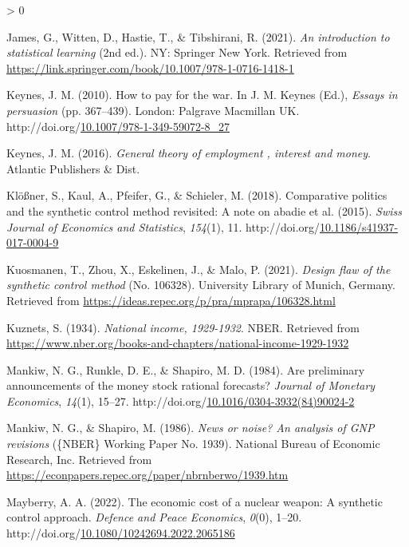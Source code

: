 \documentclass[12pt,nobind, a4paper]{reedthesis}
\newlength{\cslhangindent}
\newenvironment{CSLReferences}[2] %
{%
	\setlength{\parindent}{0pt}
	\ifodd #1 \everypar{\setlength{\hangindent}{\cslhangindent}}\ignorespaces\fi
	\ifnum #2 > 0
	\setlength{\parskip}{#2\baselineskip}
	\fi
}%
{}
\begin{document}
\begin{CSLReferences}{1}{0}
 \leavevmode\hypertarget{ref-james_introduction_2021}{}%
 James, G., Witten, D., Hastie, T., \& Tibshirani, R. (2021). \emph{An introduction to statistical learning} (2nd ed.). {NY}: Springer New York. Retrieved from \url{https://link.springer.com/book/10.1007/978-1-0716-1418-1}

 \leavevmode\hypertarget{ref-keynes_how_2010}{}%
 Keynes, J. M. (2010). How to pay for the war. In J. M. Keynes (Ed.), \emph{Essays in persuasion} (pp. 367--439). London: Palgrave Macmillan {UK}. http://doi.org/\href{https://doi.org/10.1007/978-1-349-59072-8_27}{10.1007/978-1-349-59072-8\_27}

 \leavevmode\hypertarget{ref-keynes_general_2016}{}%
 Keynes, J. M. (2016). \emph{General theory of employment , interest and money}. Atlantic Publishers \& Dist.

 \leavevmode\hypertarget{ref-klosner_comparative_2018}{}%
 Klößner, S., Kaul, A., Pfeifer, G., \& Schieler, M. (2018). Comparative politics and the synthetic control method revisited: A note on abadie et al. (2015). \emph{Swiss Journal of Economics and Statistics}, \emph{154}(1), 11. http://doi.org/\href{https://doi.org/10.1186/s41937-017-0004-9}{10.1186/s41937-017-0004-9}

 \leavevmode\hypertarget{ref-kuosmanen_design_2021}{}%
 Kuosmanen, T., Zhou, X., Eskelinen, J., \& Malo, P. (2021). \emph{Design flaw of the synthetic control method} (No. 106328). University Library of Munich, Germany. Retrieved from \url{https://ideas.repec.org/p/pra/mprapa/106328.html}

 \leavevmode\hypertarget{ref-kuznets_national_1934}{}%
 Kuznets, S. (1934). \emph{National income, 1929-1932}. {NBER}. Retrieved from \url{https://www.nber.org/books-and-chapters/national-income-1929-1932}

 \leavevmode\hypertarget{ref-mankiw_are_1984}{}%
 Mankiw, N. G., Runkle, D. E., \& Shapiro, M. D. (1984). Are preliminary announcements of the money stock rational forecasts? \emph{Journal of Monetary Economics}, \emph{14}(1), 15--27. http://doi.org/\href{https://doi.org/10.1016/0304-3932(84)90024-2}{10.1016/0304-3932(84)90024-2}

 \leavevmode\hypertarget{ref-mankiw_news_1986}{}%
 Mankiw, N. G., \& Shapiro, M. (1986). \emph{News or noise? An analysis of {GNP} revisions} (\{NBER\} Working Paper No. 1939). National Bureau of Economic Research, Inc. Retrieved from \url{https://econpapers.repec.org/paper/nbrnberwo/1939.htm}

 \leavevmode\hypertarget{ref-mayberry_economic_2022}{}%
 Mayberry, A. A. (2022). The economic cost of a nuclear weapon: A synthetic control approach. \emph{Defence and Peace Economics}, \emph{0}(0), 1--20. http://doi.org/\href{https://doi.org/10.1080/10242694.2022.2065186}{10.1080/10242694.2022.2065186}


\end{CSLReferences}
\end{document}
